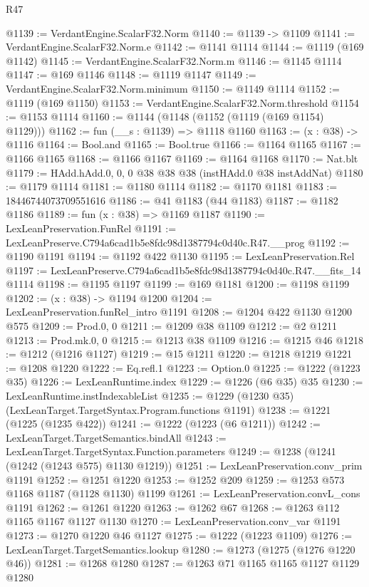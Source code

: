 \begin{lexlean}{R47}
\begin{coremodule}
@1139 := VerdantEngine.ScalarF32.Norm
@1140 := @1139 -> @1109
@1141 := VerdantEngine.ScalarF32.Norm.e
@1142 := @1141 @1114
@1144 := @1119 (@169 @1142)
@1145 := VerdantEngine.ScalarF32.Norm.m
@1146 := @1145 @1114
@1147 := @169 @1146
@1148 := @1119 @1147
@1149 := VerdantEngine.ScalarF32.Norm.minimum
@1150 := @1149 @1114
@1152 := @1119 (@169 @1150)
@1153 := VerdantEngine.ScalarF32.Norm.threshold
@1154 := @1153 @1114
@1160 := @1144 (@1148 (@1152 (@1119 (@169 @1154) @1129)))
@1162 := fun (__s : @1139) => @1118 @1160
@1163 := (x : @38) -> @1116
@1164 := Bool.and
@1165 := Bool.true
@1166 := @1164 @1165
@1167 := @1166 @1165
@1168 := @1166 @1167
@1169 := @1164 @1168
@1170 := Nat.blt
@1179 := HAdd.hAdd.{0, 0, 0} @38 @38 @38 (instHAdd.{0} @38 instAddNat)
@1180 := @1179 @1114
@1181 := @1180 @1114
@1182 := @1170 @1181
@1183 := 18446744073709551616
@1186 := @41 @1183 (@44 @1183)
@1187 := @1182 @1186
@1189 := fun (x : @38) => @1169 @1187
@1190 := LexLeanPreservation.FunRel
@1191 := LexLeanPreserve.C794a6cad1b5e8fdc98d1387794c0d40c.R47.__prog
@1192 := @1190 @1191
@1194 := @1192 @422 @1130
@1195 := LexLeanPreservation.Rel
@1197 := LexLeanPreserve.C794a6cad1b5e8fdc98d1387794c0d40c.R47.__fits_14 @1114
@1198 := @1195 @1197
@1199 := @169 @1181
@1200 := @1198 @1199
@1202 := (x : @38) -> @1194 @1200
@1204 := LexLeanPreservation.funRel_intro @1191
@1208 := @1204 @422 @1130 @1200 @575
@1209 := Prod.{0, 0}
@1211 := @1209 @38 @1109
@1212 := @2 @1211
@1213 := Prod.mk.{0, 0}
@1215 := @1213 @38 @1109
@1216 := @1215 @46
@1218 := @1212 (@1216 @1127)
@1219 := @15 @1211
@1220 := @1218 @1219
@1221 := @1208 @1220
@1222 := Eq.refl.{1}
@1223 := Option.{0}
@1225 := @1222 (@1223 @35)
@1226 := LexLeanRuntime.index
@1229 := @1226 (@6 @35) @35
@1230 := LexLeanRuntime.instIndexableList
@1235 := @1229 (@1230 @35) (LexLeanTarget.TargetSyntax.Program.functions @1191)
@1238 := @1221 (@1225 (@1235 @422))
@1241 := @1222 (@1223 (@6 @1211))
@1242 := LexLeanTarget.TargetSemantics.bindAll
@1243 := LexLeanTarget.TargetSyntax.Function.parameters
@1249 := @1238 (@1241 (@1242 (@1243 @575) @1130 @1219))
@1251 := LexLeanPreservation.conv_prim @1191
@1252 := @1251 @1220
@1253 := @1252 @209
@1259 := @1253 @573 @1168 @1187 (@1128 @1130) @1199
@1261 := LexLeanPreservation.convL_cons @1191
@1262 := @1261 @1220
@1263 := @1262 @67
@1268 := @1263 @112 @1165 @1167 @1127 @1130
@1270 := LexLeanPreservation.conv_var @1191
@1273 := @1270 @1220 @46 @1127
@1275 := @1222 (@1223 @1109)
@1276 := LexLeanTarget.TargetSemantics.lookup
@1280 := @1273 (@1275 (@1276 @1220 @46))
@1281 := @1268 @1280
@1287 := @1263 @71 @1165 @1165 @1127 @1129 @1280

\end{coremodule}
\end{lexlean}

